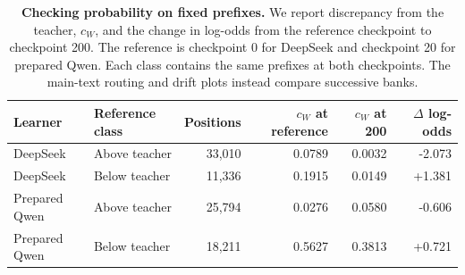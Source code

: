 \begin{table}[ht]
\centering\small
\begin{tabular}{llrrrr}
\toprule
Learner & Reference class & Positions & $c_W$ at reference & $c_W$ at 200 & $\Delta$ log-odds\\
\midrule
DeepSeek & Above teacher & 33,010 & 0.0789 & 0.0032 & -2.073\\
DeepSeek & Below teacher & 11,336 & 0.1915 & 0.0149 & +1.381\\
Prepared Qwen & Above teacher & 25,794 & 0.0276 & 0.0580 & -0.606\\
Prepared Qwen & Below teacher & 18,211 & 0.5627 & 0.3813 & +0.721\\
\bottomrule
\end{tabular}
\caption{\textbf{Checking probability on fixed prefixes.} We report discrepancy from the teacher, $c_W$, and the change in log-odds from the reference checkpoint to checkpoint 200. The reference is checkpoint 0 for DeepSeek and checkpoint 20 for prepared Qwen. Each class contains the same prefixes at both checkpoints. The main-text routing and drift plots instead compare successive banks.}\label{tab:rd-check-calibration}
\end{table}
